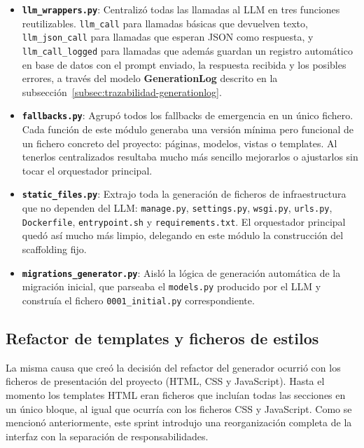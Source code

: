 \begin{itemize}
    \item \textbf{\texttt{llm\_wrappers.py}}: Centralizó todas las llamadas 
    al LLM en tres funciones reutilizables. \texttt{llm\_call} para llamadas 
    básicas que devuelven texto, \texttt{llm\_json\_call} para llamadas que 
    esperan JSON como respuesta, y \texttt{llm\_call\_logged} para llamadas 
    que además guardan un registro automático en base de datos con el prompt 
    enviado, la respuesta recibida y los posibles errores, a través del modelo 
    \textbf{GenerationLog} descrito en la 
    subsección~\ref{subsec:trazabilidad-generationlog}.

    \item \textbf{\texttt{fallbacks.py}}: Agrupó todos los fallbacks de 
    emergencia en un único fichero. Cada función de este módulo generaba una 
    versión mínima pero funcional de un fichero concreto del proyecto: 
    páginas, modelos, vistas o templates. Al tenerlos centralizados resultaba 
    mucho más sencillo mejorarlos o ajustarlos sin tocar el orquestador principal.

    \item \textbf{\texttt{static\_files.py}}: Extrajo toda la generación de 
    ficheros de infraestructura que no dependen del LLM: \texttt{manage.py}, 
    \texttt{settings.py}, \texttt{wsgi.py}, \texttt{urls.py}, \texttt{Dockerfile}, 
    \texttt{entrypoint.sh} y \texttt{requirements.txt}. El orquestador principal 
    quedó así mucho más limpio, delegando en este módulo la construcción del 
    scaffolding fijo.

    \item \textbf{\texttt{migrations\_generator.py}}: Aisló la lógica de 
    generación automática de la migración inicial, que parseaba el 
    \texttt{models.py} producido por el LLM y construía el fichero 
    \texttt{0001\_initial.py} correspondiente.
\end{itemize}

\subsection{Refactor de templates y ficheros de estilos}
\label{subsec:refactor-templates-estilos}

La misma causa que creó la decisión del refactor del generador ocurrió con los ficheros de presentación del proyecto (HTML, CSS y JavaScript).
Hasta el momento los templates HTML eran ficheros que incluían todas las secciones en un único bloque, al igual que ocurría con los ficheros CSS y JavaScript. Como se mencionó anteriormente, este sprint introdujo una reorganización completa de la interfaz con la separación de responsabilidades.


